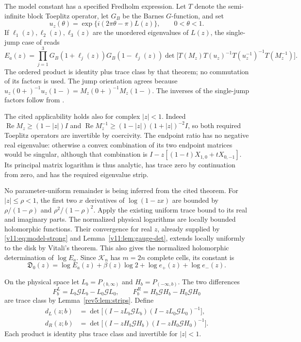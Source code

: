 The model constant has a specified Fredholm expression.  Let $T$ denote
the semi-infinite block Toeplitz operator, let $G_B$ be the Barnes
$G$-function, and set
\[
 u_z(\theta)=\exp\{i(2\pi\theta-\pi)L(z)\},\qquad0<\theta<1.
\]
If $\ell_1(z),\ell_2(z),\ell_3(z)$ are the unordered eigenvalues of
$L(z)$, the single-jump case of \cite[eq.~(2.11)]{BasorEhrhardtVirtanen2024}
reads
\begin{equation}\label{v11:eq:model-constant}
 E_a(z)=\prod_{j=1}^3G_B(1+\ell_j(z))G_B(1-\ell_j(z))
 \det\bigl[T(M_z)T(u_z)^{-1}T(u_z^{-1})^{-1}T(M_z^{-1})\bigr].
\end{equation}
The ordered product is identity plus trace class by that theorem; no
commutation of its factors is used.  The jump orientation agrees because
$u_z(0+)^{-1}u_z(1-)=M_z(0+)^{-1}M_z(1-)$.
The inverses of the single-jump factors follow from
\cite[Proposition~3.11]{BasorEhrhardtVirtanen2024}.

The cited applicability holds also for complex $|z|<1$.  Indeed
$\operatorname{Re}M_z\ge(1-|z|)I$ and
$\operatorname{Re}M_z^{-1}\ge(1-|z|)(1+|z|)^{-2}I$, so both required
Toeplitz operators are invertible by coercivity.  The endpoint ratio has
no negative real eigenvalue: otherwise a convex combination of its two
endpoint matrices would be singular, although that combination is
$I-z[(1-t)X_{1,0}+tX_{0,-1}]$.  Its principal matrix logarithm is thus
analytic, has trace zero by continuation from zero, and has the required
eigenvalue strip.

No parameter-uniform remainder is being inferred from the cited theorem.
For $|z|\le\rho<1$, the first two $x$ derivatives of $\log(1-zx)$ are
bounded by $\rho/(1-\rho)$ and $\rho^2/(1-\rho)^2$.  Apply the existing
uniform trace bound to its real and imaginary parts.  The normalized
physical logarithms are locally bounded holomorphic functions.  Their
convergence for real $z$, already supplied by
\eqref{v11:eq:model-strong} and Lemma~\ref{v11:lem:gauge-det}, extends
locally uniformly to the disk by Vitali's theorem.  This also gives the
normalized holomorphic determination of $\log E_a$.
Since $\mathcal K_n$ has $m=2n$ complete cells, its constant is
\begin{equation}\label{v11:eq:integer-constant}
 \mathfrak D_0(z)=\log E_a(z)+\beta(z)\log2
                   +\log e_+(z)+\log e_-(z).
\end{equation}

On the physical space let $L_b=P_{(b,\infty)}$ and
$H_b=P_{(-\infty,b)}$.  The two differences
\[
 F_b^L=L_b\mathcal G L_b-L_0\mathcal G L_0,
 \qquad F_b^R=H_b\mathcal G H_b-H_0\mathcal G H_0
\]
are trace class by Lemma~\ref{rev5:lem:strips}.  Define
\begin{align}
 d_L(z;b)&=\det\bigl[(I-zL_b\mathcal G L_b)
                             (I-zL_0\mathcal G L_0)^{-1}\bigr],\nonumber\\
 d_R(z;b)&=\det\bigl[(I-zH_b\mathcal G H_b)
                             (I-zH_0\mathcal G H_0)^{-1}\bigr].
 \label{v11:eq:endpoint-factors}
\end{align}
Each product is identity plus trace class and invertible for $|z|<1$.


